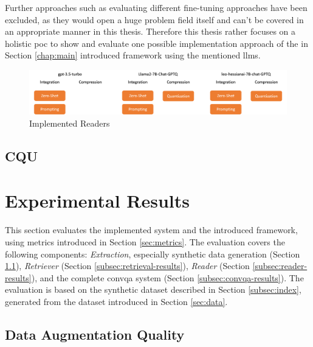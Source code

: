 Further approaches such as evaluating different fine-tuning approaches have been excluded, as they would open a huge problem field itself and can't be covered in an appropriate manner in this thesis. Therefore this thesis rather focuses on a holistic \gls{poc} to show and evaluate one possible implementation approach of the in Section \ref{chap:main} introduced framework using the mentioned \gls{llm}s.

\begin{figure}
    \centering
    \includegraphics[width=\textwidth]{Grafiken/Evaluation/reader_implemented.png}
    \caption{Implemented Readers}
    \label{fig:reader-implementation}
\end{figure}

\subsection{CQU}
\label{subsec:cqu-impl}

\section{Experimental Results}
\label{sec:results}

This section evaluates the implemented system and the introduced framework, using metrics introduced in Section \ref{sec:metrics}. The evaluation covers the following components: \textit{Extraction}, especially synthetic data generation (Section \ref{subsec:data-augmentation-quality}), \textit{Retriever} (Section \ref{subsec:retrieval-results}), \textit{Reader} (Section \ref{subsec:reader-results}), and the complete \gls{convqa} system (Section \ref{subsec:convqa-results}). The evaluation is based on the synthetic dataset described in Section \ref{subsec:index}, generated from the dataset introduced in Section \ref{sec:data}.

\subsection{Data Augmentation Quality}
\label{subsec:data-augmentation-quality}

